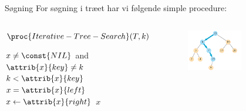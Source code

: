 \documentclass[aspectratio=1610]{beamer}
\begin{document}
\begin{frame}{Søgning}{}
    For søgning i træet har vi følgende simple procedure:

    \begin{columns}
        \begin{block}{$\proc{Iterative-Tree-Search}(T,k)$}
            \small
            
            \vspace{-\abovedisplayskip}
            \begin{codebox}
                \li \While $x \neq \const{NIL}$ and $\attrib{x}{key} \neq k$
                    \Do
                    \li \If $k < \attrib{x}{key}$
                        \Then
                            \li $x = \attrib{x}{left}$ 
                        \li \Else 
                            $x \gets \attrib{x}{right}$ 
                        \End
                    \End
                \li \Return $x$
            \end{codebox}
        \end{block}

        \begin{figure}[h]
            \centering
            \includegraphics[width=0.6\textwidth]{bst/tree-search}
        \end{figure}
    

\end{columns}
\end{frame}
\end{document}
